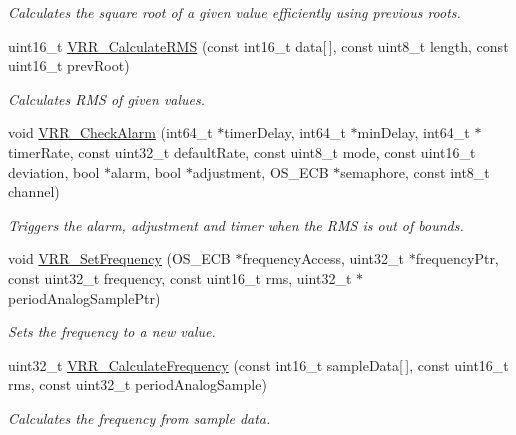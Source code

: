 \begin{DoxyCompactItemize}
\begin{DoxyCompactList}\small\item\em Calculates the square root of a given value efficiently using previous roots. \end{DoxyCompactList}\item 
uint16\+\_\+t \hyperlink{group___v_r_r__module_ga133f79b2a87bb1e8c5ec256642b2e0d5}{V\+R\+R\+\_\+\+Calculate\+R\+M\+S} (const int16\+\_\+t data\mbox{[}$\,$\mbox{]}, const uint8\+\_\+t length, const uint16\+\_\+t prev\+Root)
\begin{DoxyCompactList}\small\item\em Calculates R\+M\+S of given values. \end{DoxyCompactList}\item 
void \hyperlink{group___v_r_r__module_ga19d2f6b20d6ec746b143317ea8add0db}{V\+R\+R\+\_\+\+Check\+Alarm} (int64\+\_\+t $\ast$timer\+Delay, int64\+\_\+t $\ast$min\+Delay, int64\+\_\+t $\ast$timer\+Rate, const uint32\+\_\+t default\+Rate, const uint8\+\_\+t mode, const uint16\+\_\+t deviation, bool $\ast$alarm, bool $\ast$adjustment, O\+S\+\_\+\+E\+C\+B $\ast$semaphore, const int8\+\_\+t channel)
\begin{DoxyCompactList}\small\item\em Triggers the alarm, adjustment and timer when the R\+M\+S is out of bounds. \end{DoxyCompactList}\item 
void \hyperlink{group___v_r_r__module_ga86c619fba042609fa87246ef742e466e}{V\+R\+R\+\_\+\+Set\+Frequency} (O\+S\+\_\+\+E\+C\+B $\ast$frequency\+Access, uint32\+\_\+t $\ast$frequency\+Ptr, const uint32\+\_\+t frequency, const uint16\+\_\+t rms, uint32\+\_\+t $\ast$period\+Analog\+Sample\+Ptr)
\begin{DoxyCompactList}\small\item\em Sets the frequency to a new value. \end{DoxyCompactList}\item 
uint32\+\_\+t \hyperlink{group___v_r_r__module_ga62b2158646147efadf49c870f3245c0d}{V\+R\+R\+\_\+\+Calculate\+Frequency} (const int16\+\_\+t sample\+Data\mbox{[}$\,$\mbox{]}, const uint16\+\_\+t rms, const uint32\+\_\+t period\+Analog\+Sample)
\begin{DoxyCompactList}\small\item\em Calculates the frequency from sample data. \end{DoxyCompactList}\end{DoxyCompactItemize}
